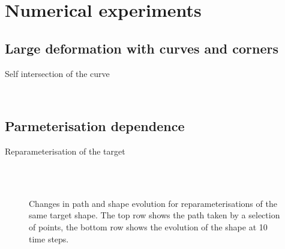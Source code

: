 \documentclass{beamer}
\begin{document}
\section{Numerical experiments}
\subsection{Large deformation with curves and corners}
\begin{frame}{Self intersection of the curve}
\begin{figure}
  \centering
  \\
\label{fig:intersection}
\end{figure}
\end{frame}

\subsection{Parmeterisation dependence}
\begin{frame}{Reparameterisation of the target}
\begin{figure}
  \centering
  \\
  \\
  \caption{Changes in path and shape evolution for reparameterisations of the
    same target shape. The top row shows the path taken by a selection of points,
    the bottom row shows the evolution of the shape at 10 time steps.}
  \label{fig:reparams}
\end{figure}

\end{frame}
\end{document}
